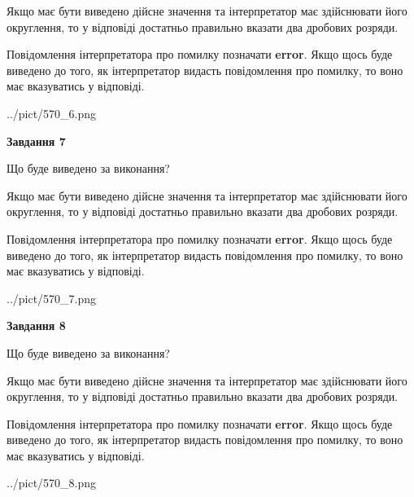 \documentclass[12pt, ukrainian]{article}
\begin{document}
{\begin {Large}
Якщо має бути виведено дійсне значення та інтерпретатор має здійснювати його округлення, 
то у відповіді достатньо правильно вказати два дробових розряди.

Повідомлення інтерпретатора про помилку позначати \textbf{error}.
Якщо щось буде виведено до того, як інтерпретатор видасть повідомлення про помилку, 
то воно має вказуватись у відповіді. \par

\begin{center}
	{../pict/570_6.png}
\end{center}
\newpage

{\begin {center}\textbf{Завдання 7}\end {center}}\par
Що буде виведено за виконання? \par

Якщо має бути виведено дійсне значення та інтерпретатор має здійснювати його округлення, 
то у відповіді достатньо правильно вказати два дробових розряди.

Повідомлення інтерпретатора про помилку позначати \textbf{error}.
Якщо щось буде виведено до того, як інтерпретатор видасть повідомлення про помилку, 
то воно має вказуватись у відповіді. \par

\begin{center}
	{../pict/570_7.png}
\end{center}
\newpage

{\begin {center}\textbf{Завдання 8}\end {center}}\par
Що буде виведено за виконання? \par

Якщо має бути виведено дійсне значення та інтерпретатор має здійснювати його округлення, 
то у відповіді достатньо правильно вказати два дробових розряди.

Повідомлення інтерпретатора про помилку позначати \textbf{error}.
Якщо щось буде виведено до того, як інтерпретатор видасть повідомлення про помилку, 
то воно має вказуватись у відповіді. \par

\begin{center}
	{../pict/570_8.png}
\end{center}
\newpage


\end{Large}}
\end{document}
